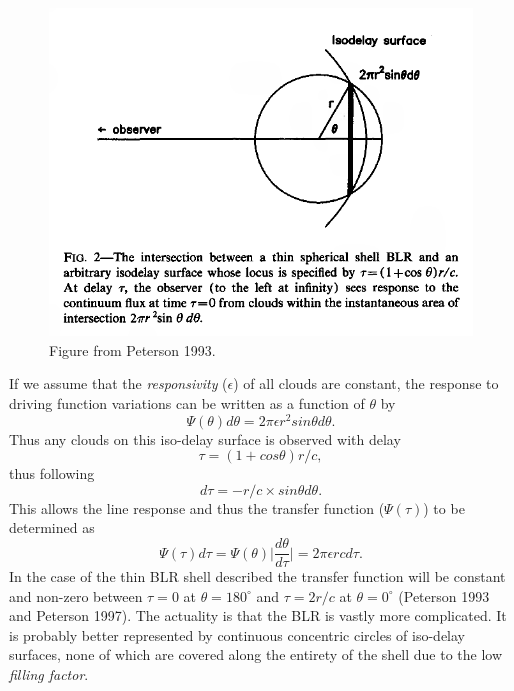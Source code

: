 \documentclass[a4paper, 12pt, twoside]{article}
\begin{document}
\begin{figure}[t!]
\centering
\includegraphics[width=1.00\linewidth]{Figure/BLR_iso_delay.png}
\caption{Figure from Peterson 1993.}
\label{BLR_iso_delay}
\end{figure}
If we assume that the \emph{responsivity} ($\epsilon$) of all clouds are constant, the response to driving function variations can be written as a function of $\theta$ by 
\begin{equation}
\Psi(\theta)d\theta = 2\pi\epsilon r^{2}sin\theta d\theta.
\label{eq:theta_response_function}
\end{equation}
Thus any clouds on this iso-delay surface is observed with delay
\begin{equation}
\tau = (1 + cos\theta)r/c,
\label{eq:cloud_delay}
\end{equation}
thus following
\begin{equation}
d\tau = -r/c\times sin\theta d\theta.
\label{eq:d_tau}
\end{equation}
This allows the line response and thus the transfer function ($\Psi(\tau)$) to be determined as
\begin{equation}
\Psi(\tau)d\tau = \Psi(\theta)\bigg|\frac{d\theta}{d\tau}\bigg| = 2\pi\epsilon rcd\tau.
\label{eq:d_tau}
\end{equation}
In the case of the thin BLR shell described the transfer function will be constant and non-zero between $\tau = 0$ at $\theta = 180^{\circ}$ and $\tau=2r/c$ at $\theta = 0^{\circ}$ (Peterson 1993 and Peterson 1997). The actuality is that the BLR is vastly more complicated. It is probably better represented by continuous concentric circles of iso-delay surfaces, none of which are covered along the entirety of the shell due to the low \emph{filling factor}. \\
\end{document}
